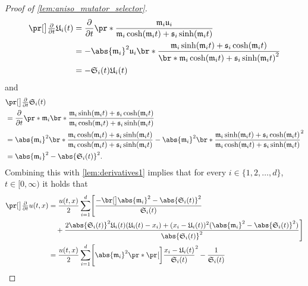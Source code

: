 \begin{proof}[Proof of \cref{lem:aniso_mutator_selector}]
\begin{equation}
\begin{aligned}
			\bpr{\tfrac{\partial }{\partial t}\mathfrak{U}_i}(t) &= \frac{\partial }{\partial t} \pr*{ \frac{\mathfrak{m}_i \mathfrak{u}_i}{\mathfrak{m}_i \cosh(\mathfrak{m}_i  t) + \mathfrak{s}_i \sinh(\mathfrak{m}_i t)} }
			\\ &= 
			- \abs{\mathfrak{m}_i}^2 \mathfrak{u}_i \br*{ \frac{\mathfrak{m}_i \sinh(\mathfrak{m}_i  t) + \mathfrak{s}_i \cosh(\mathfrak{m}_i t)}{\br*{ \mathfrak{m}_i \cosh(\mathfrak{m}_i  t) + \mathfrak{s}_i \sinh(\mathfrak{m}_i t)}^2} }
			\\ &= 
			- \mathfrak{S}_i(t)    \mathfrak{U}_i(t) 
		\end{aligned}
		\end{equation}
		and
		\begin{equation}
		\begin{aligned}
			&\bpr{\tfrac{\partial }{\partial t}\mathfrak{S}_i}(t) 
			\\&= \frac{\partial }{\partial t} \pr*{ \mathfrak{m}_i \br*{ \frac{\mathfrak{m}_i \sinh(\mathfrak{m}_i  t) + \mathfrak{s}_i \cosh(\mathfrak{m}_i t)}{\mathfrak{m}_i \cosh(\mathfrak{m}_i  t) + \mathfrak{s}_i \sinh(\mathfrak{m}_i t)}}} 
			\\ &= 
			\abs{\mathfrak{m}_i}^2 \br*{ \frac{\mathfrak{m}_i \cosh(\mathfrak{m}_i  t) + \mathfrak{s}_i \sinh(\mathfrak{m}_i t)}{\mathfrak{m}_i \cosh(\mathfrak{m}_i  t) + \mathfrak{s}_i \sinh(\mathfrak{m}_i t)}} - \abs{\mathfrak{m}_i}^2\br*{ \frac{\mathfrak{m}_i \sinh(\mathfrak{m}_i  t) + \mathfrak{s}_i \cosh(\mathfrak{m}_i t)}{ \mathfrak{m}_i \cosh(\mathfrak{m}_i  t) + \mathfrak{s}_i \sinh(\mathfrak{m}_i t)} }^2
			\\ &= 
			\abs{\mathfrak{m}_i}^2  - \abs{\mathfrak{S}_i(t)}^2
			.
		\end{aligned}
		\end{equation}
	Combining 
		this 
	with 
		\eqref{lem:derivatives1} 
	implies that for every
		$i \in \{1, 2,\dots,d\}$,
		$t \in [0,\infty)$
	it holds that
	\begin{align}
		\nonumber \bpr{\tfrac{\partial }{\partial t}u} (t,x)  
		&= 
		\frac{u(t,x)}{2} \sum_{i=1}^d\Biggl[ \frac{-\bbr{\abs{\mathfrak{m}_i}^2  - \abs{\mathfrak{S}_i(t)}^2}}{\mathfrak{S}_i(t)} \\
		\nonumber &\quad + \frac{ 2\abs{\mathfrak{S}_i(t)}^2  \mathfrak{U}_i(t) (\mathfrak{U_i}(t) - x_i) + (x_i-\mathfrak{U}_i(t))^2 (\abs{\mathfrak{m}_i}^2  - \abs{\mathfrak{S}_i(t)}^2)}{\abs{\mathfrak{S}_i(t)}^{2}}\Biggr]
		\\ &= 
		\label{lem:derivatives1*}
		\frac{u(t,x)}{2} \sum_{i=1}^d\Biggl[ \abs{\mathfrak{m}_i}^2  \pr*{ \bbbpr{\frac{x_i - \mathfrak{U}_i(t)}{\mathfrak{S}_i(t)}}^{2} - \frac{1}{\mathfrak{S}_i(t)} } \\

\end{align}
\end{proof}
